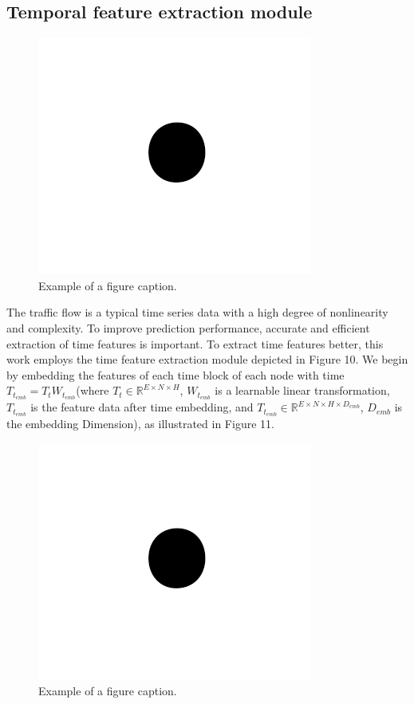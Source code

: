 \documentclass[conference]{IEEEtran}
\begin{document}
\subsection{Temporal feature extraction module}
\begin{figure}[htbp]
    \centerline{\includegraphics{fig1.png}}
    \caption{Example of a figure caption.}
    \label{fig}
\end{figure}
\par
The traffic flow is a typical time series data with a high degree of nonlinearity and complexity. To improve prediction performance, accurate and efficient extraction of time features is important. To extract time features better, this work employs the time feature extraction module depicted in Figure 10. We begin by embedding the features of each time block of each node with time $T_{t_{emb}} = T_tW_{t_{emb}} $(where $T_t \in \mathbb{R} ^ {E \times N \times H}$, $W_{t_{emb}}$ is a learnable linear transformation, $T_{t_{emb}}$ is the feature data after time embedding, and $ T_{t_{emb}} \in \mathbb{R} ^{E \times N \times H \times D_{emb}}$, $D_{emb}$ is the embedding Dimension), as illustrated in Figure 11.
\begin{figure}[htbp]
    \centerline{\includegraphics{fig1.png}}
    \caption{Example of a figure caption.}
    \label{fig}
\end{figure}
\end{document}
